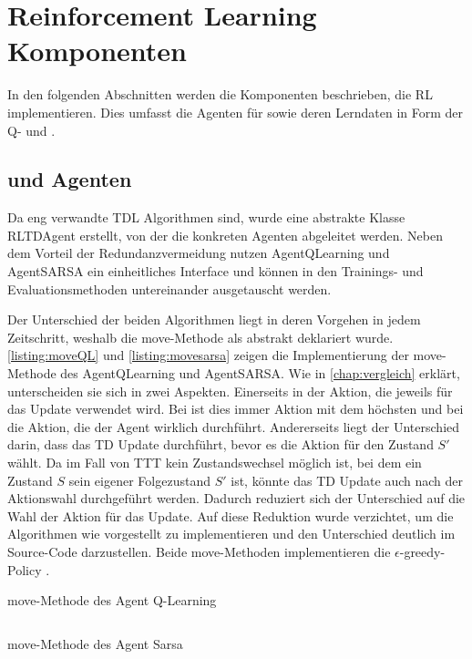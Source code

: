 \section{Reinforcement Learning Komponenten}
In den folgenden Abschnitten werden die Komponenten beschrieben, die \acl{RL} implementieren. 
Dies umfasst die Agenten für \bothAlgs sowie deren Lerndaten in Form der Q- und \wtable.

\subsection{\qlearning und \sarsa Agenten}
Da \bothAlgs eng verwandte \ac{TDL} Algorithmen sind, wurde eine abstrakte Klasse RLTDAgent erstellt, von der die konkreten Agenten abgeleitet werden. 
Neben dem Vorteil der Redundanzvermeidung nutzen AgentQLearning und AgentSARSA ein einheitliches Interface und können in den Trainings- und Evaluationsmethoden untereinander ausgetauscht werden.

Der Unterschied der beiden Algorithmen liegt in deren Vorgehen in jedem Zeitschritt, weshalb die move-Methode als abstrakt deklariert wurde. 
\cref{listing:moveQL} und \cref{listing:movesarsa} zeigen die Implementierung der move-Methode des AgentQLearning und AgentSARSA. 
Wie in \cref{chap:vergleich} erklärt, unterscheiden sie sich in zwei Aspekten. 
Einerseits in der Aktion, die jeweils für das Update verwendet wird. 
Bei \qlearning ist dies immer Aktion mit dem höchsten  \qValue und bei \sarsa die Aktion, die der Agent wirklich durchführt. 
Andererseits liegt der Unterschied darin, dass \qlearning das \ac{TD} Update durchführt, bevor es die Aktion für den Zustand $S'$ wählt. 
Da im Fall von \acs{TTT} kein Zustandswechsel möglich ist, bei dem ein Zustand $S$ sein eigener Folgezustand $S'$ ist, könnte das \acl{TD} Update auch nach der Aktionswahl durchgeführt werden. 
Dadurch reduziert sich der Unterschied auf die Wahl der Aktion für das Update. 
Auf diese Reduktion wurde verzichtet, um die Algorithmen wie vorgestellt zu implementieren und den Unterschied deutlich im Source-Code darzustellen. Beide move-Methoden implementieren die $\epsilon$-greedy-Policy \cite[S. 27f.]{suttonReinforcementLearningIntroduction2018}.

\begin{listing}[p]
\caption{move-Methode des Agent Q-Learning}
\label{listing:moveQL}
\inputminted{java}{04_Artefakte/03_Listings/move_qlearning.java}
\end{listing}

\begin{listing}[p]
\caption{move-Methode des Agent Sarsa}
\label{listing:movesarsa}
\inputminted{java}{04_Artefakte/03_Listings/move_sarsa.java}
\end{listing}

